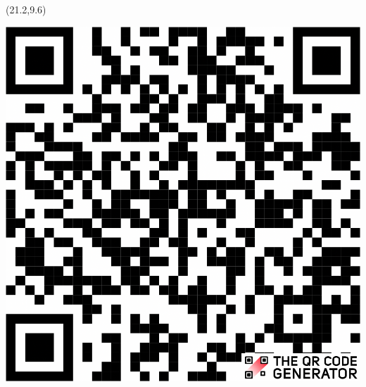 \documentclass[a0]{a0poster}
\begin{document}
\begin{textblock}{2}(21.2,9.6)
\begin{center}
\includegraphics[width=0.7\TPHorizModule]{neon_repo_qr.png}
\end{center}
\end{textblock}
\end{document}
